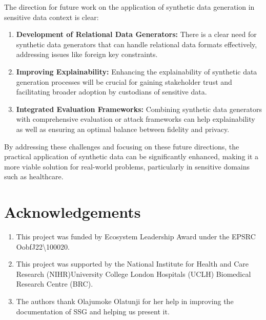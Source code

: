 \documentclass[11pt]{article}
\begin{document}
The direction for future work on the application of synthetic data generation in sensitive data context is clear:

\begin{enumerate}
    \item \textbf{Development of Relational Data Generators: } There is a clear need for synthetic data generators that can handle relational data formats effectively, addressing issues like foreign key constraints.
    \item \textbf{Improving Explainability:} Enhancing the explainability of synthetic data generation processes will be crucial for gaining stakeholder trust and facilitating broader adoption by custodians of sensitive data.
    \item \textbf{Integrated Evaluation Frameworks: }Combining synthetic data generators with comprehensive evaluation or attack frameworks can help explainability as well as ensuring an optimal balance between fidelity and privacy.
\end{enumerate}

By addressing these challenges and focusing on these future directions, the practical application of synthetic data can be significantly enhanced, making it a more viable solution for real-world problems, particularly in sensitive domains such as healthcare.

\section{Acknowledgements}

\begin{enumerate}
    \item This project was funded by Ecosystem Leadership Award under the EPSRC OobfJ22\textbackslash100020.
    \item This project was supported by the National Institute for Health and Care Research (NIHR)University College London Hospitals (UCLH) Biomedical Research Centre (BRC).
    \item  The authors thank Olajumoke Olatunji for her help in improving the documentation of SSG and helping us present it.
\end{enumerate}



\end{document}

